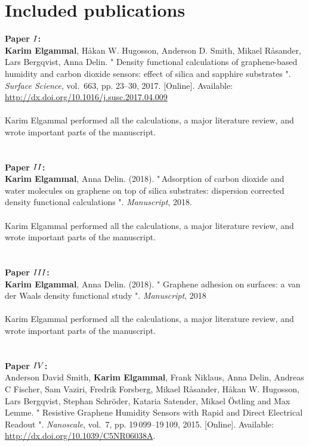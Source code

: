 \chapter*{Included publications}
\textbf{Paper $\Rmnum{1}$: \label{P1}}  \\         %
\textbf{Karim Elgammal}, H{\aa}kan W. Hugosson, Anderson D. Smith, Mikael R{\aa}sander, Lars Bergqvist, Anna Delin. " Density functional calculations of graphene-based humidity and carbon dioxide sensors: effect of silica and sapphire substrates ". \emph{Surface Science}, vol.~663, pp. 23--30, 2017. [Online]. Available: \url{http://dx.doi.org/10.1016/j.susc.2017.04.009} \\ \\
Karim Elgammal performed all the calculations, a major literature review, and wrote important parts of the manuscript. 
\\ \\ \\
\textbf{Paper $\Rmnum{2}$: \label{P2}} \\
\textbf{Karim Elgammal}, Anna Delin. (2018). "\,Adsorption of carbon dioxide and water molecules on graphene on top of silica substrates: dispersion corrected density functional calculations ". \emph{Manuscript}, 2018.  \\ \\
Karim Elgammal performed all the calculations, a major literature review, and wrote important parts of the manuscript. 
\\ \\ \\
\textbf{Paper $\Rmnum{3}$: \label{P3}} \\
\textbf{Karim Elgammal}, Anna Delin. (2018). " Graphene adhesion on surfaces: a van der Waals density functional study ". \emph{Manuscript}, 2018  \\ \\
Karim Elgammal performed all the calculations, a major literature review, and wrote important parts of the manuscript. 
\\ \\ \\
\textbf{Paper $\Rmnum{4}$: \label{P4}} \\          %
Anderson David Smith, \textbf{Karim Elgammal}, Frank Niklaus, Anna Delin, Andreas C Fischer, Sam Vaziri, Fredrik Forsberg, Mikael R{\aa}sander, H{\aa}kan W. Hugosson, Lars Bergqvist, Stephan Schr{\"{o}}der, Kataria Satender, Mikael {\"{O}}stling and Max Lemme. " Resistive Graphene Humidity Sensors with Rapid and Direct Electrical Readout ". \emph{Nanoscale}, vol.~7, pp. 19\,099--19\,109, 2015. [Online]. Available: \url{http://dx.doi.org/10.1039/C5NR06038A}.\\ \\
